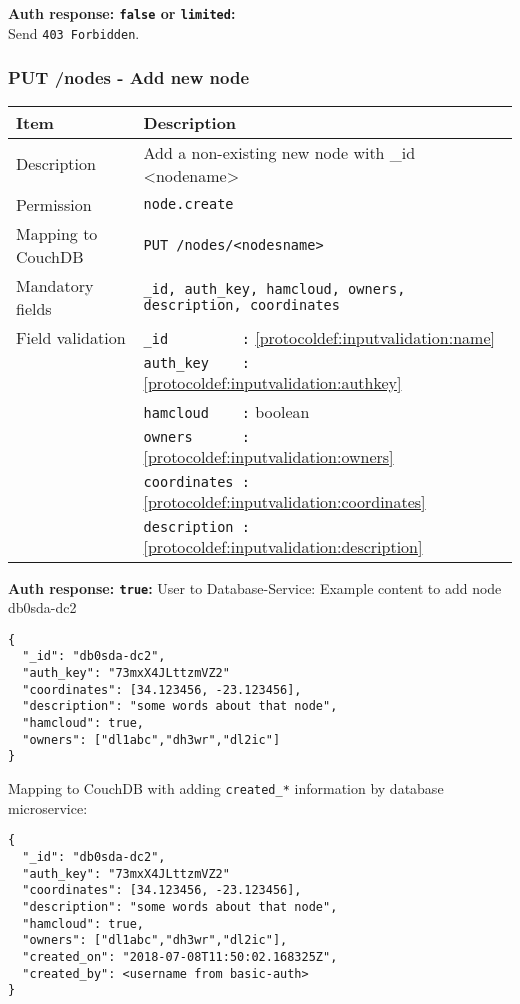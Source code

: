 \textbf{Auth response: \texttt{false} or \texttt{limited}:}\\
Send \verb|403 Forbidden|.

\newpage
\subsubsection{PUT /nodes - Add new node}
\label{protocoldef:microservicesapi:database:putnodes/node_create}
\begin{table}[htbp]
  \begin{tabular}{|l|p{12cm}|} \hline
    Item               & Description  \\ \hline \hline
    Description        & Add a non-existing new node with \_id <nodename>\\ \hline
    Permission         & \verb|node.create| \\ \hline
    Mapping to CouchDB & \verb|PUT /nodes/<nodesname>|\\ \hline
    Mandatory fields   & \verb|_id, auth_key, hamcloud, owners, description, coordinates| \\ \hline
    Field validation   & \verb|_id         :| \ref{protocoldef:inputvalidation:name} \\
                       & \verb|auth_key    :| \ref{protocoldef:inputvalidation:authkey} \\
                       & \verb|hamcloud    :| boolean \\
                       & \verb|owners      :| \ref{protocoldef:inputvalidation:owners} \\
                       & \verb|coordinates :| \ref{protocoldef:inputvalidation:coordinates}\\
                       & \verb|description :| \ref{protocoldef:inputvalidation:description}\\ \hline
  \end{tabular}
\end{table}

\textbf{Auth response: \texttt{true}:}
User to Database-Service: Example content to add node db0sda-dc2
\begin{lstlisting}
{
  "_id": "db0sda-dc2",
  "auth_key": "73mxX4JLttzmVZ2"
  "coordinates": [34.123456, -23.123456],
  "description": "some words about that node",
  "hamcloud": true,
  "owners": ["dl1abc","dh3wr","dl2ic"]
}
\end{lstlisting}

Mapping to CouchDB with adding \verb|created_*| information by database microservice:\\
\begin{lstlisting}
{
  "_id": "db0sda-dc2",
  "auth_key": "73mxX4JLttzmVZ2"
  "coordinates": [34.123456, -23.123456],
  "description": "some words about that node",
  "hamcloud": true,
  "owners": ["dl1abc","dh3wr","dl2ic"],
  "created_on": "2018-07-08T11:50:02.168325Z",
  "created_by": <username from basic-auth>
}
\end{lstlisting}

